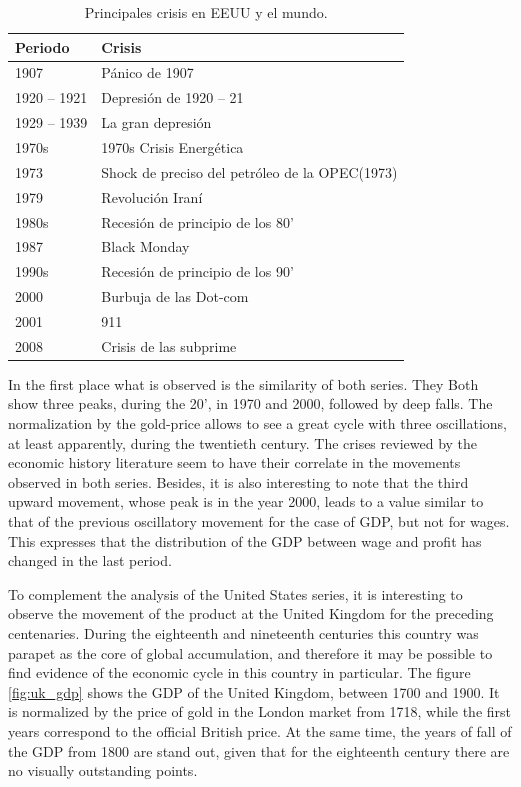 \documentclass[a4paper]{article}
\begin{document}
\begin{table}[ht]
	\centering
	\begin{tabular}{ll}
		\hline
		Periodo & Crisis \\ 
		\hline
		1907 & Pánico de 1907 \\ 
		1920 – 1921 & Depresión de 1920 – 21 \\ 
		1929 – 1939 & La gran depresión \\ 
		1970s & 1970s Crisis Energética \\ 
		1973 & Shock de preciso del petróleo de la OPEC(1973) \\ 
		1979 & Revolución Iraní\\ 
		1980s & Recesión de principio de los 80'\\ 
		1987 & Black Monday \\ 
		1990s & Recesión de principio de los 90'\\ 
		2000 & Burbuja de las Dot-com \\ 
		2001 & 911 \\ 
		2008 & Crisis de las subprime \\ 
		\hline
	\end{tabular}
\caption{Principales crisis en EEUU y el mundo.}
\label{tabla_crisis}
\end{table}

In the first place what is observed is the similarity of both series. They Both show three peaks, during the 20', in 1970 and 2000, followed by deep falls. The normalization by the gold-price allows to see a great cycle with three oscillations, at least apparently, during the twentieth century. The crises reviewed by the economic history literature seem to have their correlate in the movements observed in both series. Besides, it is also interesting to note that the third upward movement, whose peak is in the year 2000, leads to a value similar to that of the previous oscillatory movement for the case of GDP, but not for wages. This expresses that the distribution of the GDP between wage and profit has changed in the last period.

To complement the analysis of the United States series, it is interesting to observe the movement of the product at the United Kingdom for the preceding centenaries. During the eighteenth and nineteenth centuries this country was parapet as the core of global accumulation, and therefore it may be possible to find evidence of the economic cycle in this country in particular. The figure \ref{fig:uk_gdp} shows the GDP of the United Kingdom, between 1700 and 1900. It is normalized by the price of gold in the London market from 1718, while the first years correspond to the official British price. At the same time, the years of fall of the GDP from 1800 are stand out, given that for the eighteenth century there are no visually outstanding points.
\end{document}
